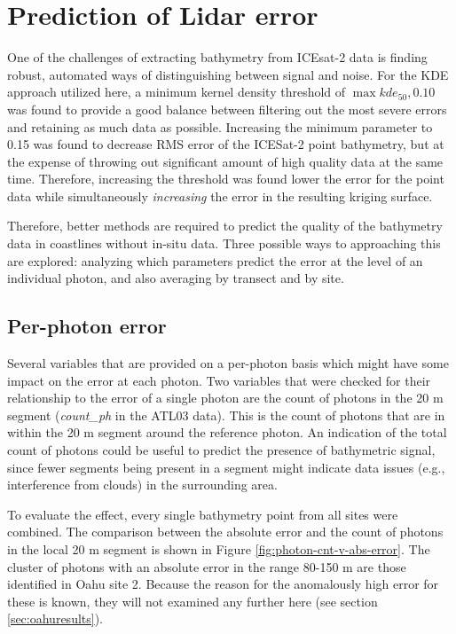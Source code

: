 \section{Prediction of Lidar error}

One of the challenges of extracting bathymetry from ICEsat-2 data is finding robust, automated ways of distinguishing between signal and noise. For the KDE approach utilized here, a minimum kernel density threshold of $\max{kde_{50},0.10}$ was found to provide a good balance between filtering out the most severe errors and retaining as much data as possible. Increasing the minimum parameter to 0.15 was found to decrease RMS error of the ICESat-2 point bathymetry, but at the expense of throwing out significant amount of high quality data at the same time. Therefore, increasing the threshold was found lower the error for the point data while simultaneously \emph{increasing} the error in the resulting kriging surface.

Therefore, better methods are required to predict the quality of the bathymetry data in coastlines without in-situ data. Three possible ways to approaching this are explored: analyzing which parameters predict the error at the level of an individual photon, and also averaging by transect and by site.

\subsection{Per-photon error}
Several variables that are provided on a per-photon basis which might have some impact on the error at each photon. Two variables that were checked for their relationship to the error of a single photon are the count of photons in the 20 m segment (\emph{count\_ph} in the ATL03 data). This is the count of photons that are in within the 20 m segment around the reference photon. An indication of the total count of photons could be useful to predict the presence of bathymetric signal, since fewer segments being present in a segment might indicate data issues (e.g., interference from clouds) in the surrounding area.

To evaluate the effect, every single bathymetry point from all sites were combined. The comparison between the absolute error and the count of photons in the local 20 m segment is shown in Figure \ref{fig:photon-cnt-v-abs-error}. The cluster of photons with an absolute error in the range 80-150 m are those identified in Oahu site 2. Because the reason for the anomalously high error for these is known, they will not examined any further here (see section \ref{sec:oahuresults}).

